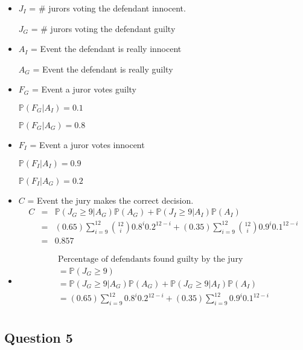 \documentclass[12pt]{article}
\begin{document}
\begin{itemize}
  \item $J_I$ = \# jurors voting the defendant innocent.

	  $J_G$ = \# jurors voting the defendant guilty
  \item $A_I$ = Event the defendant is really innocent

	  $A_G$ = Event the defendant is really guilty
  \item $F_G$ = Event a juror votes guilty

	 $\mathbb{P}(F_G|A_I) = 0.1$

	 $\mathbb{P}(F_G|A_G) = 0.8$

  \item $F_I$ = Event a juror votes innocent

	 $\mathbb{P}(F_I|A_I) = 0.9$ 

	 $\mathbb{P}(F_I|A_G) = 0.2$
  \item $C$ = Event the jury makes the correct decision.
	 \begin{eqnarray*}
	    C &=& \mathbb{P}(J_G \geq 9|A_G)\mathbb{P}(A_G) 
		    + \mathbb{P}(J_I \geq 9|A_I)\mathbb{P}(A_I) \\
	      &=& (0.65)\sum_{i=9}^{12}\binom{12}{i}0.8^i 0.2^{12-i}
		    + (0.35)\sum_{i=9}^{12}\binom{12}{i}0.9^i 0.1^{12-i} \\
	      &=& 0.857
	 \end{eqnarray*}
  \item \begin{eqnarray*}
	   \text{Percentage of defendants found guilty by the jury} \\
		      = \mathbb{P}(J_G \geq 9) \\
	  		=\mathbb{P}(J_G \geq 9|A_G)\mathbb{P}(A_G)
			   +\mathbb{P}(J_G \geq 9|A_I)\mathbb{P}(A_I) \\
		      = (0.65)\sum_{i=9}^{12}0.8^i 0.2^{12-i}
			   +(0.35)\sum_{i=9}^{12}0.9^i 0.1^{12-i} \\
	\end{eqnarray*}
\end{itemize}




\subsection{Question 5}
\end{document}
